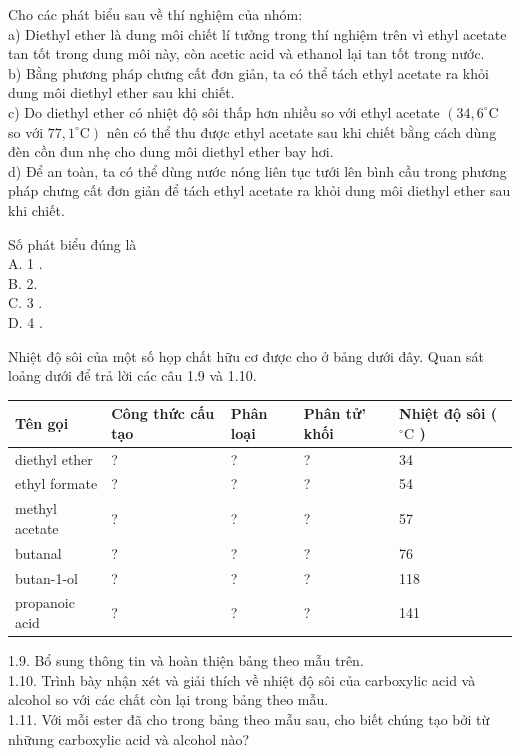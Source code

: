 \documentclass[10pt]{article}
\begin{document}
Cho các phát biểu sau về thí nghiệm của nhóm:\\
a) Diethyl ether là dung môi chiết lí tưởng trong thí nghiệm trên vì ethyl acetate tan tốt trong dung môi này, còn acetic acid và ethanol lại tan tốt trong nước.\\
b) Bằng phương pháp chưng cất đơn giản, ta có thể tách ethyl acetate ra khỏi dung môi diethyl ether sau khi chiết.\\
c) Do diethyl ether có nhiệt độ sôi thấp hơn nhiều so với ethyl acetate $\left(34,6^{\circ} \mathrm{C}\right.$ so với $\left.77,1^{\circ} \mathrm{C}\right)$ nên có thể thu được ethyl acetate sau khi chiết bằng cách dùng đèn cồn đun nhẹ cho dung môi diethyl ether bay hơi.\\
d) Để an toàn, ta có thể dùng nước nóng liên tục tưới lên bình cầu trong phương pháp chưng cất đơn giản để tách ethyl acetate ra khỏi dung môi diethyl ether sau khi chiết.

Số phát biểu đúng là\\
A. 1 .\\
B. 2.\\
C. 3 .\\
D. 4 .

Nhiệt độ sôi của một số họp chất hữu cơ được cho ở bảng dưới đây. Quan sát loảng dưới để trả lời các câu 1.9 và 1.10.

\begin{center}
\begin{tabular}{|l|l|l|l|l|}
\hline
Tên gọi & Công thức cấu tạo & Phân loại & Phân tử' khối & Nhiệt độ sôi ( ${ }^{\circ} \mathrm{C}$ ) \\
\hline
diethyl ether & ? & ? & ? & 34 \\
\hline
ethyl formate & ? & ? & ? & 54 \\
\hline
methyl acetate & ? & ? & ? & 57 \\
\hline
butanal & ? & ? & ? & 76 \\
\hline
butan-1-ol & ? & ? & ? & 118 \\
\hline
propanoic acid & ? & ? & ? & 141 \\
\hline
\end{tabular}
\end{center}

1.9. Bổ sung thông tin và hoàn thiện bảng theo mẫu trên.\\
1.10. Trình bày nhận xét và giải thích về nhiệt độ sôi của carboxylic acid và alcohol so với các chất còn lại trong bảng theo mẫu.\\
1.11. Với mỗi ester đã cho trong bảng theo mẫu sau, cho biết chúng tạo bởi từ nhữung carboxylic acid và alcohol nào?
\end{document}
